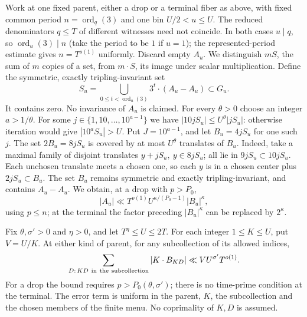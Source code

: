 Work at one fixed parent, either a drop or a terminal fiber as
above, with fixed common period \(n=\operatorname{ord}_q(3)\)
and one bin \(U/2<u\le U\). The reduced denominators \(q\le T\)
of different witnesses need not coincide. In both cases \(u\mid q\),
so \(\operatorname{ord}_u(3)\mid n\) (take the period to be \(1\)
if \(u=1\)); the represented-period estimate gives \(n=T^{o(1)}\)
uniformly. Discard empty \(A_u\). We distinguish \(mS\), the sum
of \(m\) copies of a set, from \(m\cdot S\), its image under scalar
multiplication. Define the symmetric, exactly tripling-invariant set
\[
 S_u=\bigcup_{0\le t<\operatorname{ord}_u(3)}3^t\cdot(A_u-A_u)
       \subset G_u .
\]
It contains zero. No invariance of \(A_u\) is claimed. For every
\(\theta>0\) choose an integer \(a>1/\theta\). For some
\(j\in\{1,10,\ldots,10^{a-1}\}\) we have
\(|10jS_u|\le U^\theta |jS_u|\): otherwise iteration would give
\(|10^a S_u|>U\). Put \(J=10^{a-1}\), and let \(B_u=4jS_u\) for
one such \(j\). The set \(2B_u=8jS_u\) is covered by at most
\(U^\theta\) translates of \(B_u\). Indeed, take a maximal family
of disjoint translates \(y+jS_u,\ y\in 8jS_u\); all lie in
\(9jS_u\subset10jS_u\). Each unchosen translate meets a chosen
one, so each \(y\) is in a chosen center plus \(2jS_u\subset B_u\).
The set \(B_u\) remains symmetric and exactly tripling-invariant,
and contains \(A_u-A_u\). We obtain, at a drop with \(p>P_0\),
\begin{equation}\label{eq:bool-container}
 |A_u|\ll T^{o(1)} U^{\kappa/(P_0-1)} |B_u|^\kappa ,
\end{equation}
using \(p\le n\); at the terminal the factor preceding
\(|B_u|^\kappa\) can be replaced by \(2^\kappa\).

\begin{lemma}\label{lem:lcm}
Fix \(\theta,\sigma'>0\) and \(\eta>0\), and let
\(T^\eta\le U\le 2T\). For each integer \(1\le K\le U\), put
\(V=U/K\). At either kind of parent, for any subcollection of its
allowed indices,
\[
 \sum_{D:\,KD\ {\rm in\ the\ subcollection}} |K\cdot B_{KD}|
     \ll V U^{\sigma'} T^{o(1)} .
\]
For a drop the bound requires \(p>P_0(\theta,\sigma')\);
there is no time-prime condition at the terminal. The error term
is uniform in the parent, \(K\), the subcollection and the chosen
members of the finite menu. No coprimality of \(K,D\) is assumed.
\end{lemma}

